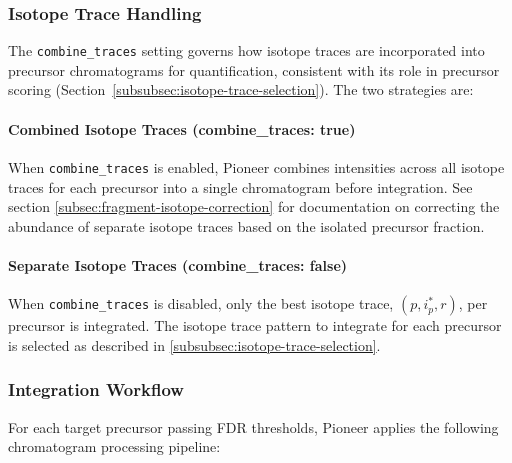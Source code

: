 \documentclass[pdflatex,sn-nature]{sn-jnl}
\begin{document}
\subsubsection{Isotope Trace Handling}\label{subsubsec:isotope-trace-handling}

The \texttt{combine\_traces} setting governs how isotope traces are incorporated into precursor chromatograms for quantification, consistent with its role in precursor scoring (Section~\ref{subsubsec:isotope-trace-selection}). The two strategies are:

\paragraph{Combined Isotope Traces (combine\_traces: true)}\label{para:combined-isotope-traces} 
When \texttt{combine\_traces} is enabled, Pioneer combines intensities across all isotope traces for each precursor into a single chromatogram before integration. See section \ref{subsec:fragment-isotope-correction} for documentation on correcting the abundance of separate isotope traces based on the isolated precursor fraction.

\paragraph{Separate Isotope Traces (combine\_traces: false)}\label{para:separate-isotope-traces} 
When \texttt{combine\_traces} is disabled, only the best isotope trace, $(p, i^*_p, r)$, per precursor is integrated. The isotope trace pattern to integrate for each precursor is selected as described in \ref{subsubsec:isotope-trace-selection}.

\subsubsection{Integration Workflow}\label{subsubsec:integration-workflow}

For each target precursor passing FDR thresholds, Pioneer applies the following chromatogram processing pipeline:
\end{document}
